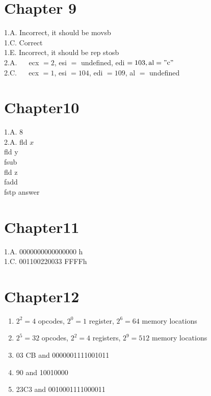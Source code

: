 \documentclass[10pt]{book}
\begin{document}
\begin{center}
\begin{center}
\begin{center}
\begin{center}
\begin{center}
\section*{Chapter 9}
1.A. Incorrect, it should be movsb\\
1.C. Correct\\
1.E. Incorrect, it should be rep stosb\\
2.A. $\quad$ ecx $=2$, esi $=$ undefined, edi $=103, \mathrm{al}=" \mathrm{c} "$\\
2.C. $\quad$ ecx $=1$, esi $=104$, edi $=109$, al $=$ undefined

\section*{Chapter10}
1.A. 8\\
2.A. fld $x$\\
fld y\\
fsub\\
fld z\\
fadd\\
fstp answer

\section*{Chapter11}
1.A. 0000000000000000 h\\
1.C. 001100220033 FFFFh

\section*{Chapter12}
\begin{enumerate}
  \item $2^{2}=4$ opcodes, $2^{0}=1$ register, $2^{6}=64$ memory locations
  \item $2^{5}=32$ opcodes, $2^{2}=4$ registers, $2^{9}=512$ memory locations
  \item 03 CB and 0000001111001011
  \item 90 and 10010000
  \item 23C3 and 0010001111000011
\end{enumerate}



\end{center}
\end{center}
\end{center}
\end{center}
\end{center}
\end{document}
